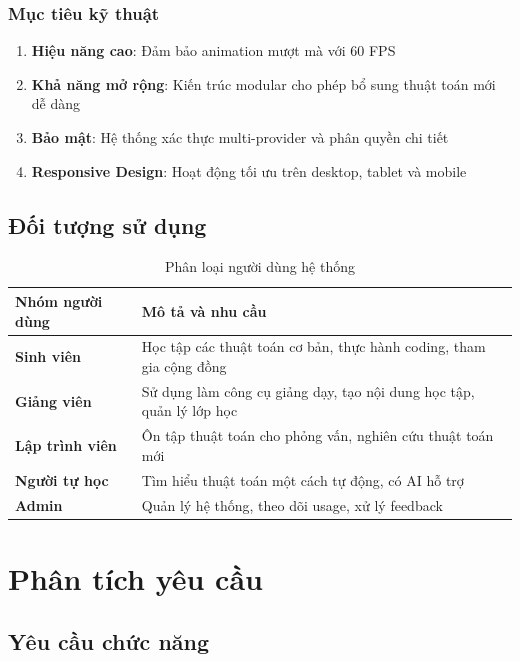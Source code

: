 \documentclass[12pt,a4paper]{article}
\begin{document}
\subsubsection{Mục tiêu kỹ thuật}
\begin{enumerate}
    \item \textbf{Hiệu năng cao}: Đảm bảo animation mượt mà với 60 FPS
    \item \textbf{Khả năng mở rộng}: Kiến trúc modular cho phép bổ sung thuật toán mới dễ dàng
    \item \textbf{Bảo mật}: Hệ thống xác thực multi-provider và phân quyền chi tiết
    \item \textbf{Responsive Design}: Hoạt động tối ưu trên desktop, tablet và mobile
\end{enumerate}

\subsection{Đối tượng sử dụng}

\begin{table}[H]
\centering
\caption{Phân loại người dùng hệ thống}
\begin{tabular}{|l|p{10cm}|}
\hline
\textbf{Nhóm người dùng} & \textbf{Mô tả và nhu cầu} \\
\hline
\textbf{Sinh viên} & Học tập các thuật toán cơ bản, thực hành coding, tham gia cộng đồng \\
\hline
\textbf{Giảng viên} & Sử dụng làm công cụ giảng dạy, tạo nội dung học tập, quản lý lớp học \\
\hline
\textbf{Lập trình viên} & Ôn tập thuật toán cho phỏng vấn, nghiên cứu thuật toán mới \\
\hline
\textbf{Người tự học} & Tìm hiểu thuật toán một cách tự động, có AI hỗ trợ \\
\hline
\textbf{Admin} & Quản lý hệ thống, theo dõi usage, xử lý feedback \\
\hline
\end{tabular}
\end{table}

\section{Phân tích yêu cầu}

\subsection{Yêu cầu chức năng}
\end{document}
